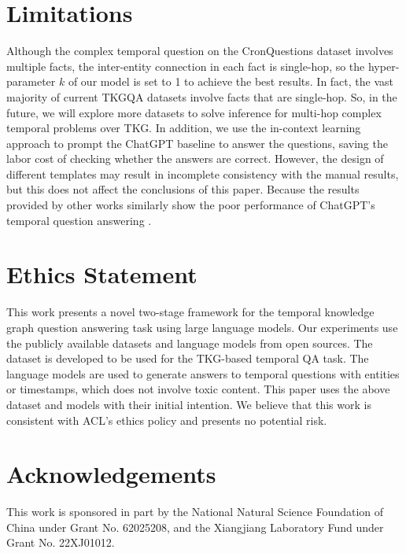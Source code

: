 \documentclass[11pt]{article}
\begin{document}

\section*{Limitations}

Although the complex temporal question on the CronQuestions dataset involves multiple facts, the inter-entity connection in each fact is single-hop, so the hyper-parameter $k$ of our model is set to 1 to achieve the best results. 
In fact, the vast majority of current TKGQA datasets involve facts that are single-hop. 
So, in the future, we will explore more datasets to solve inference for multi-hop complex temporal problems over TKG.
In addition, we use the in-context learning approach to prompt the ChatGPT baseline to answer the questions, saving the labor cost of checking whether the answers are correct. However, the design of different templates may result in incomplete consistency with the manual results, but this does not affect the conclusions of this paper. Because the results provided by other works similarly show the poor performance of ChatGPT's temporal question answering \cite{TEMPReason,ARI}.

\section*{Ethics Statement}

This work presents a novel two-stage framework for the temporal knowledge graph question answering task using large language models.
Our experiments use the publicly available datasets and language models from open sources.
The dataset is developed to be used for the TKG-based temporal QA task. The language models are used to generate answers to temporal questions with entities or timestamps, which does not involve toxic content.
This paper uses the above dataset and models with their initial intention.
We believe that this work is consistent with ACL's ethics policy and presents no potential risk.

\section*{Acknowledgements}
This work is sponsored in part by the National Natural Science Foundation of China under Grant No. 62025208, and the Xiangjiang Laboratory Fund under Grant No. 22XJ01012.

\end{document}
